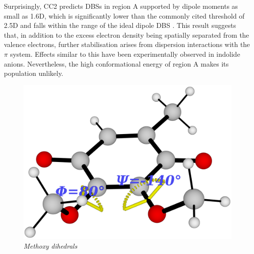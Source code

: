 Surprisingly, CC2 predicts DBSs in region A supported by dipole moments as small as 1.6D, which is significantly lower than the commonly cited threshold of 2.5D and falls within the range of the ideal dipole DBS \cite{jordan2003theory}. This result suggests that, in addition to the excess electron density being spatially separated from the valence electrons, further stabilisation arises from dispersion interactions with the $\pi$ system. Effects similar to this have been experimentally observed in indolide anions\cite{yuan2023observation}. Nevertheless, the high conformational energy of region A makes its population unlikely.

\begin{figure}[h]
  \centering
  \begin{minipage}[b]{0.30\textwidth}
    \centering
    \includegraphics[width=1.15\textwidth]{chapters/results/image/dihedrals.png}
    \vspace{15pt}
    \small\emph{Methoxy dihedrals}
  \end{minipage}
  \hfill
  \begin{minipage}[b]{0.30\textwidth}
    \centering

\end{minipage}
\end{figure}
